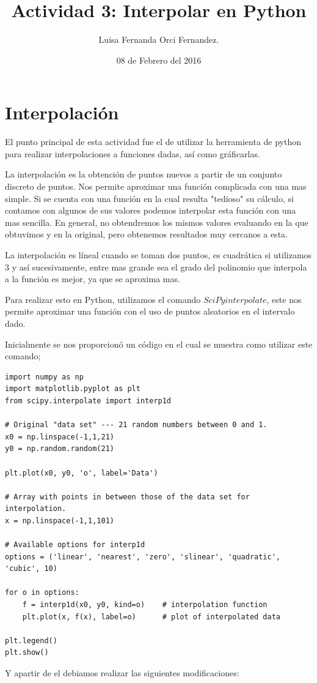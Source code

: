 \documentclass[12pt,letterpaper]{article}
\begin{document}
\title{Actividad 3: Interpolar en Python}
\author{Luisa Fernanda Orci Fernandez.}
\date{08 de Febrero del 2016}

\maketitle

\section*{Interpolación}

El punto principal de esta actividad fue el de utilizar la herramienta de python para realizar interpolaciones a funciones dadas, así como gráficarlas.

La interpolación es la obtención de puntos nuevos a partir de un conjunto discreto de puntos. Nos permite aproximar una función complicada con una mas simple. Si se cuenta con una función en la cual resulta "tedioso" su cálculo, si contamos con algunos de sus valores podemos interpolar esta función con una mas sencilla. En general, no obtendremos los mismos valores evaluando en la que obtuvimos y en la original, pero obtenemos resultados muy cercanos a esta.

La interpolación es líneal cuando se toman dos puntos, es cuadrática si utilizamos 3 y así sucesivamente, entre mas grande sea el grado del polinomio que interpola a la función es mejor, ya que se aproxima mas. 

Para realizar esto en Python, utilizamos el comando $SciPyinterpolate$, este nos permite aproximar una función con el uso de puntos aleatorios en el intervalo dado. 

Inicialmente se nos proporcionó un código en el cual se muestra como utilizar este comando; 

\begin{verbatim}
import numpy as np
import matplotlib.pyplot as plt
from scipy.interpolate import interp1d

# Original "data set" --- 21 random numbers between 0 and 1.
x0 = np.linspace(-1,1,21)
y0 = np.random.random(21)

plt.plot(x0, y0, 'o', label='Data')

# Array with points in between those of the data set for interpolation.
x = np.linspace(-1,1,101)

# Available options for interp1d
options = ('linear', 'nearest', 'zero', 'slinear', 'quadratic', 'cubic', 10)

for o in options:
    f = interp1d(x0, y0, kind=o)    # interpolation function
    plt.plot(x, f(x), label=o)      # plot of interpolated data

plt.legend()
plt.show()
\end{verbatim}
Y apartir de el debiamos realizar las siguientes modificaciones:
\end{document}
